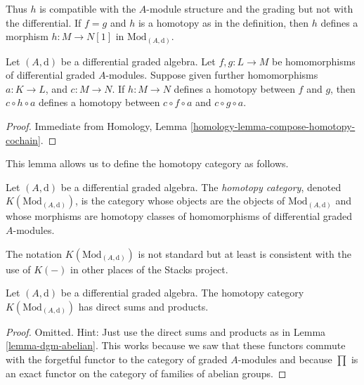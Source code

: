 \noindent
Thus $h$ is compatible with the $A$-module structure and the grading
but not with the differential. If $f = g$ and $h$ is a homotopy
as in the definition, then $h$ defines a morphism $h : M \to N[1]$
in $\text{Mod}_{(A, \text{d})}$.

\begin{lemma}
\label{lemma-compose-homotopy}
Let $(A, \text{d})$ be a differential graded algebra.
Let $f, g : L \to M$ be homomorphisms of differential graded $A$-modules.
Suppose given further homomorphisms $a : K \to L$, and $c : M \to N$.
If $h : M \to N$ defines a homotopy between $f$ and $g$, then
$c \circ h \circ a$ defines a homotopy between $c \circ f \circ a$ and
$c \circ g \circ a$.
\end{lemma}

\begin{proof}
Immediate from Homology, Lemma \ref{homology-lemma-compose-homotopy-cochain}.
\end{proof}

\noindent
This lemma allows us to define the homotopy category as follows.

\begin{definition}
\label{definition-complexes-notation}
Let $(A, \text{d})$ be a differential graded algebra.
The {\it homotopy category}, denoted $K(\text{Mod}_{(A, \text{d})})$, is
the category whose objects are the objects of
$\text{Mod}_{(A, \text{d})}$ and whose morphisms are homotopy classes
of homomorphisms of differential graded $A$-modules.
\end{definition}

\noindent
The notation $K(\text{Mod}_{(A, \text{d})})$ is not standard but at least is
consistent with the use of $K(-)$ in other places of the Stacks project.

\begin{lemma}
\label{lemma-homotopy-direct-sums}
Let $(A, \text{d})$ be a differential graded algebra.
The homotopy category $K(\text{Mod}_{(A, \text{d})})$
has direct sums and products.
\end{lemma}

\begin{proof}
Omitted. Hint: Just use the direct sums and products as in
Lemma \ref{lemma-dgm-abelian}. This works because we saw that
these functors commute with the forgetful functor to the category
of graded $A$-modules and because $\prod$ is an exact functor
on the category of families of abelian groups.
\end{proof}







